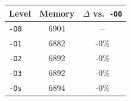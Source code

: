 \begin{tabular*}{\columnwidth}{@{\extracolsep\fill}lcc@{\extracolsep\fill}}
\toprule
\textbf{Level} & \textbf{Memory} & \textbf{$\Delta$ vs.\ \texttt{-O0}} \\
\midrule
\texttt{-O0} & 6904 & -- \\
\texttt{-O1} & 6882 & -0\% \\
\texttt{-O2} & 6892 & -0\% \\
\texttt{-O3} & 6892 & -0\% \\
\texttt{-Os} & 6894 & -0\% \\
\bottomrule
\end{tabular*}
